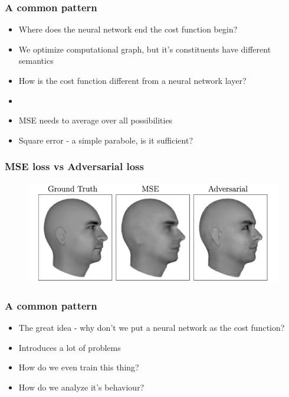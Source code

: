 \documentclass{beamer}
\begin{document}
\begin{frame}
	\frametitle{A common pattern}
	\begin{itemize}
		\item Where does the neural network end the cost function begin?
		\item We optimize computational graph, but it's constituents have different semantics
		\item How is the cost function different from a neural network layer?
		\item 
		\item MSE needs to average over all possibilities
		\item Square error - a simple parabole, is it sufficient?
	\end{itemize}
\end{frame}
\begin{frame}
	\frametitle{MSE loss vs Adversarial loss}
	\begin{figure}[h!]
	\centering
	\includegraphics[width=\textwidth]{mse_vs_adversarial.png}
\end{figure}

\end{frame}
\begin{frame}
	\frametitle{A common pattern}
	\begin{itemize}
		\item The great idea - why don't we put a neural network as the cost function?
		\item Introduces a lot of problems
		\item How do we even train this thing?
		\item How do we analyze it's behaviour?
	\end{itemize}
\end{frame}
\end{document}

